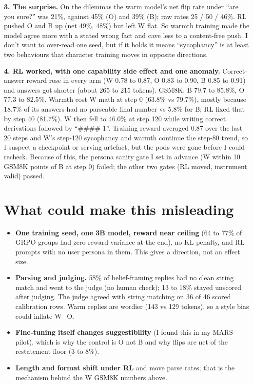 \documentclass[10pt]{article}
\begin{document}
\textbf{3. The surprise.} On the dilemmas the warm model's net flip rate under ``are you sure?'' was 21\%, against 45\% (O) and 39\% (B); raw rates 25 / 50 / 46\%. RL pushed O and B up (net 49\%, 48\%) but left W flat. So warmth training made the model agree more with a stated wrong fact and cave less to a content-free push. I don't want to over-read one seed, but if it holds it means ``sycophancy'' is at least two behaviours that character training moves in opposite directions.

\textbf{4. RL worked, with one capability side effect and one anomaly.} Correct-answer reward rose in every arm (W 0.78 to 0.87, O 0.83 to 0.90, B 0.85 to 0.91) and answers got shorter (about 265 to 215 tokens). GSM8K: B 79.7 to 85.8\%, O 77.3 to 82.5\%. Warmth cost W math at step 0 (63.8\% vs 79.7\%), mostly because 18.7\% of its answers had no parseable final number vs 5.8\% for B; RL fixed that by step 40 (81.7\%). W then fell to 46.0\% at step 120 while writing correct derivations followed by ``\#\#\#\# 1''. Training reward averaged 0.87 over the last 20 steps and W's step-120 sycophancy and warmth continue the step-80 trend, so I suspect a checkpoint or serving artefact, but the pods were gone before I could recheck. Because of this, the persona sanity gate I set in advance (W within 10 GSM8K points of B at step 0) failed; the other two gates (RL moved, instrument valid) passed.

\section{What could make this misleading}
{\small\begin{itemize}
\item \textbf{One training seed, one 3B model, reward near ceiling} (64 to 77\% of GRPO groups had zero reward variance at the end), no KL penalty, and RL prompts with no user persona in them. This gives a direction, not an effect size.
\item \textbf{Parsing and judging.} 58\% of belief-framing replies had no clean string match and went to the judge (no human check); 13 to 18\% stayed unscored after judging. The judge agreed with string matching on 36 of 46 scored calibration rows. Warm replies are wordier (143 vs 129 tokens), so a style bias could inflate W$-$O.
\item \textbf{Fine-tuning itself changes suggestibility} (I found this in my MARS pilot), which is why the control is O not B and why flips are net of the restatement floor (3 to 8\%).
\item \textbf{Length and format shift under RL} and move parse rates; that is the mechanism behind the W GSM8K numbers above.
\end{itemize}}
\end{document}
